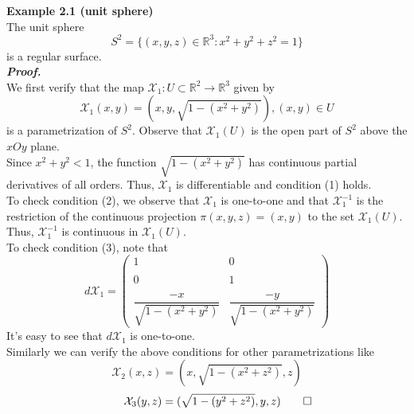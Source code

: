 \documentclass{article}
\begin{document}
\par
\textbf{Example 2.1 (unit sphere)}\\
The unit sphere
$$
    S^2 = \{(x,y,z) \in \mathbb{R}^3: x^2+y^2+z^2=1\}
$$
is a regular surface.\\
\textbf{\textit{Proof.}}\\
We first verify that the map $\mathcal{X}_1: U \subset \mathbb{R}^2 \to \mathbb{R}^3$ given by
$$
    \mathcal{X}_1(x,y) = (x, y, \sqrt{1-(x^2+y^2)}), (x,y) \in U
$$
is a parametrization of $S^2$. Observe that $\mathcal{X}_1(U)$ is the open part of $S^2$ above
the $xOy$ plane.\\
Since $x^2+y^2<1$, the function $\sqrt{1-(x^2+y^2)}$ has continuous partial derivatives of all orders.
Thus, $\mathcal{X}_1$ is differentiable and condition (1) holds.\\
To check condition (2), we observe that $\mathcal{X}_1$ is one-to-one and that $\mathcal{X}_1^{-1}$ is
the restriction of the continuous projection $\pi(x,y,z) = (x,y)$ to the set $\mathcal{X}_1(U)$. Thus,
$\mathcal{X}_1^{-1}$ is continuous in $\mathcal{X}_1(U)$.\\
To check condition (3), note that
$$
    d{\mathcal{X}_{1}} = 
    \left(\begin{array}{cc} 
        1 & 0 \\\\
        0 & 1 \\\\
        \dfrac{-x}{\sqrt{1-(x^2+y^2)}} & \dfrac{-y}{\sqrt{1-(x^2+y^2)}}
    \end{array}\right)
$$
It's easy to see that $d\mathcal{X}_1$ is one-to-one.\\
Similarly we can verify the above conditions for other parametrizations like
$$
    \mathcal{X}_2(x,z) = (x, \sqrt{1-(x^2+z^2)}, z)
$$
$$
    \quad \quad \mathcal{X}_3(y,z) = (\sqrt{1-(y^2+z^2)}, y, z) \qed
$$
\end{document}
